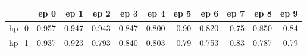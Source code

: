 \begin{tabular}{lrrrrrrrrrr}
\toprule
{} &   ep 0 &   ep 1 &   ep 2 &   ep 3 &   ep 4 &  ep 5 &   ep 6 &  ep 7 &   ep 8 &  ep 9 \\
\midrule
hp\_0 &  0.957 &  0.947 &  0.943 &  0.847 &  0.800 &  0.90 &  0.820 &  0.75 &  0.850 &  0.84 \\
hp\_1 &  0.937 &  0.923 &  0.793 &  0.840 &  0.803 &  0.79 &  0.753 &  0.83 &  0.787 &  0.79 \\
\bottomrule
\end{tabular}
